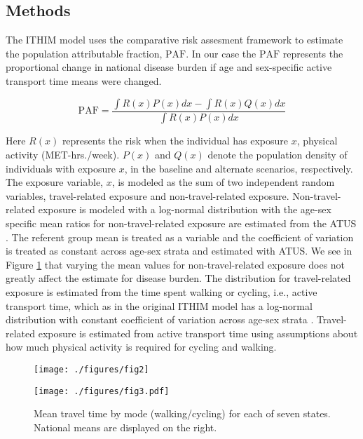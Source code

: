 \documentclass{bioinfo}
\newcommand{\af}{\textrm{PAF}}
\newcommand{\mets}{MET-hrs./week}
\newcommand{\logNormal}{log-normal}
\begin{document}
\begin{methods}

\section{Methods}

The ITHIM model uses the comparative risk assesment framework to
estimate the population attributable fraction, $\af$.  In our case the
$\af$ represents the proportional change in national disease burden if
age and sex-specific active transport time means were changed.

\begin{equation}
\af = \frac{\int R(x)P(x) dx  - \int R(x)Q(x) dx }{\int R(x)P(x) dx}
\end{equation}

Here $R(x)$ represents the risk when the individual has exposure $x$,
physical activity (\mets).  $P(x)$ and $Q(x)$ denote the population
density of individuals with exposure $x$, in the baseline and
alternate scenarios, respectively.  The exposure variable, $x$, is
modeled as the sum of two independent random variables, travel-related
exposure and non-travel-related exposure.  Non-travel-related exposure
is modeled with a \logNormal{} distribution with the age-sex specific
mean ratios for non-travel-related exposure are estimated from the
ATUS \cite{ATUS}.  The referent group mean is treated as a variable
and the coefficient of variation is treated as constant across age-sex
strata and estimated with ATUS.  We see in Figure \ref{dalyFigure}
that varying the mean values for non-travel-related exposure does not
greatly affect the estimate for disease burden.  The distribution for
travel-related exposure is estimated from the time spent walking or
cycling, i.e., active transport time, which as in the original ITHIM
model has a \logNormal{} distribution with constant coefficient of
variation across age-sex strata \cite{}.  Travel-related exposure
is estimated from active transport time using assumptions about how
much physical activity is required for cycling and walking.

\end{methods}

\begin{figure}[t]
    \centerline{\texttt{[image: ./figures/fig2]}}
    \caption{}\label{dalyFigure}
\end{figure}

\begin{figure}[t]
  \centerline{\texttt{[image: ./figures/fig3.pdf]}}
    \caption{Mean travel time by mode (walking/cycling) for each of
      seven states.  National means are displayed on the
      right.}\label{meanMatrices}
\end{figure}
\end{document}
